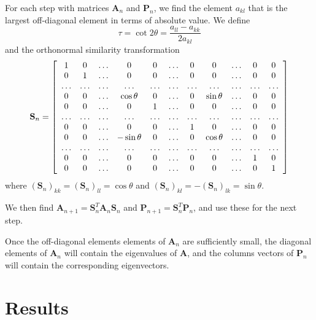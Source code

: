 \documentclass[11pt,a4paper]{article}
\newcommand\V[1]{\mathbf{#1}}                  %
\begin{document}
For each step with matrices $\V{A}_n$ and $\V{P}_n$, we find the element $a_{kl}$ that is the largest off-diagonal element in terms of absolute value. We define
\begin{equation}
  \tau = \cot 2 \theta = \frac{a_{ll} - a_{kk}}{2 a_{kl}}
\end{equation}
and the orthonormal similarity transformation
\begin{equation}
  \V{S}_n = \left[ \begin{array}{*{20}c}
    1 & 0 & \ldots & 0 & 0 & \ldots & 0 & 0 & \ldots & 0 & 0 \\
    0 & 1 & \ldots & 0 & 0 & \ldots & 0 & 0 & \ldots & 0 & 0 \\
    \ldots & \ldots & \ldots & \ldots & \ldots & \ldots & \ldots & \ldots & \ldots & \ldots & \ldots \\
    0 & 0 & \ldots & \cos \theta & 0& \ldots & 0 & \sin \theta & \ldots & 0 & 0 \\
    0 & 0 & \ldots & 0 & 1 & \ldots & 0 & 0 & \ldots & 0 & 0 \\
    \ldots & \ldots & \ldots & \ldots & \ldots & \ldots & \ldots & \ldots & \ldots & \ldots & \ldots \\
    0 & 0 & \ldots & 0 & 0 & \ldots & 1 & 0 & \ldots & 0 & 0 \\
    0 & 0 & \ldots & -\sin\theta & 0 & \ldots & 0 & \cos \theta & \ldots & 0 & 0 \\
    \ldots & \ldots & \ldots & \ldots & \ldots & \ldots & \ldots & \ldots & \ldots & \ldots & \ldots \\
    0 & 0 & \ldots & 0 & 0 & \ldots & 0 & 0 & \ldots & 1 & 0 \\
    0 & 0 & \ldots & 0 & 0 & \ldots & 0 & 0 & \ldots & 0 & 1 \\
  \end{array} \right]
\end{equation}
where $(\V{S}_n)_{kk} = (\V{S}_n)_{ll} = \cos \theta$ and $(\V{S}_n)_{kl} = - (\V{S}_n)_{lk} = \sin \theta$.

We then find $\V{A}_{n+1} = \V{S}_n^T \V{A}_n \V{S}_n$ and $\V{P}_{n+1} = \V{S}_n^T \V{P}_n$, and use these for the next step.

Once the off-diagonal elements elements of $\V{A}_n$ are sufficiently small, the diagonal elements of $\V{A}_n$ will contain the eigenvalues of $\V{A}$, and the columns vectors of $\V{P}_n$ will contain the corresponding eigenvectors.

\section{Results}
\end{document}
